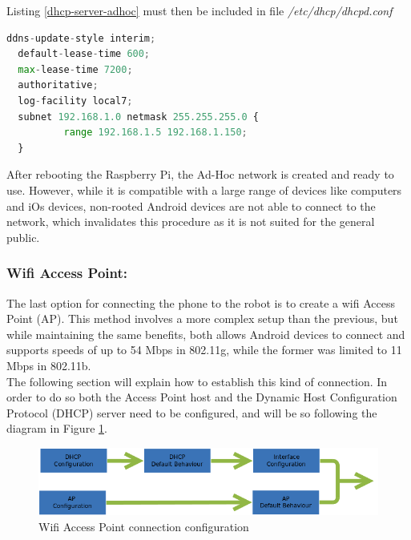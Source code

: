 Listing \ref{dhcp-server-adhoc} must then be included in file \textit{/etc/dhcp/dhcpd.conf} \\

	\begin{minipage}{\linewidth}%
	\begin{lstlisting}[label=dhcp-server-adhoc,caption=DHCP Server Configuration {[} /etc/dhcp/dhcpd.conf {]} ,language=python ]
  ddns-update-style interim;
  default-lease-time 600;
  max-lease-time 7200;
  authoritative;
  log-facility local7;
  subnet 192.168.1.0 netmask 255.255.255.0 {
		  range 192.168.1.5 192.168.1.150;
  }
	\end{lstlisting}
	\end{minipage}

\bigskip	
After rebooting the Raspberry Pi, the Ad-Hoc network is created and ready to use. However, while it is compatible with a large range of devices like computers and iOs devices, non-rooted Android devices are not able to connect to the network, which invalidates this procedure as it is not suited for the general public.












\subsubsection{Wifi Access Point:}

The last option for connecting the phone to the robot is to create a wifi Access Point (AP). This method involves a more complex setup than the previous, but while maintaining the same benefits, both allows Android devices to connect and supports speeds of up to 54 Mbps in 802.11g, while the former was limited to 11 Mbps in 802.11b.\\

The following section will explain how to establish this kind of connection. In order to do so both the Access Point host and the Dynamic Host Configuration Protocol (DHCP) server need to be configured, and will be so following the diagram in Figure \ref{apdiagram}.\\

  \begin{figure}[H]
      \centering
      \includegraphics[scale=.6]{images/Diagrams/wifiAP.png}
      \caption{ Wifi Access Point connection configuration }
      \label{apdiagram}
  \end{figure}
  \bigskip


